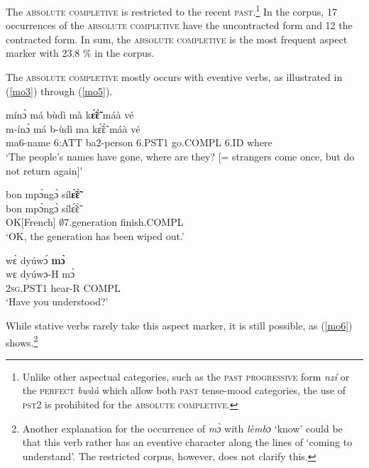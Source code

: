 The \textsc{absolute completive} is restricted to the recent \textsc{past}.\footnote{Unlike other aspectual categories, such as the \textsc{past} \textsc{progressive} form {\itshape nzí} or the \textsc{perfect} {\itshape bwàà} which allow both \textsc{past} tense-mood categories, the use of \textsc{pst2} is prohibited for the \textsc{absolute completive}.}
In the corpus, 17 occurrences of the \textsc{absolute completive} have the uncontracted form and 12 the contracted form. In sum, the \textsc{absolute completive} is the most frequent aspect marker with 23.8 \% in the corpus.

The \textsc{absolute completive} mostly occurs with eventive verbs, as illustrated in (\ref{mo3}) through (\ref{mo5}).

\begin{exe} 
\ex\label{mo3} 
  \glll   mínɔ̀ má bùdì mà k{\bfseries ɛ̃́ɛ̃̀} máà vé \\
          m-ínɔ̀ má b-ùdì ma kɛ̃́ɛ̃̀ máà vé \\
            ma6-name 6:ATT ba2-person 6.PST1 go.COMPL 6.ID where \\
    \trans `The people's names have gone, where are they? [= strangers come once, but do not return again]'
\end{exe}

\begin{exe} 
\ex\label{mo4}
  \glll bon mpɔ̀ngɔ̀ síl{\bfseries ɛ̃́ɛ̃̀}\\
        bon mpɔ̀ngɔ̀ sílɛ̃́ɛ̃̀ \\
      OK[French] $\emptyset$7.generation finish.COMPL \\
    \trans `OK, the generation has been wiped out.'
\end{exe}

\begin{exe} 
\ex\label{mo5}
  \glll wɛ̀ dyúwɔ́ {\bfseries mɔ̀}\\
       wɛ dyúwɔ-H mɔ̀ \\
      2\textsc{sg}.PST1 hear-R COMPL   \\
    \trans `Have you understood?'
\end{exe}

\noindent While stative verbs rarely take this aspect marker, it is still possible, as (\ref{mo6}) shows.\footnote{Another explanation for the occurrence of {\itshape mɔ̀} with {\itshape lèmbɔ} `know' could be that this verb rather has an eventive character along the lines of `coming to understand'. The restricted corpus, however, does not clarify this.}

